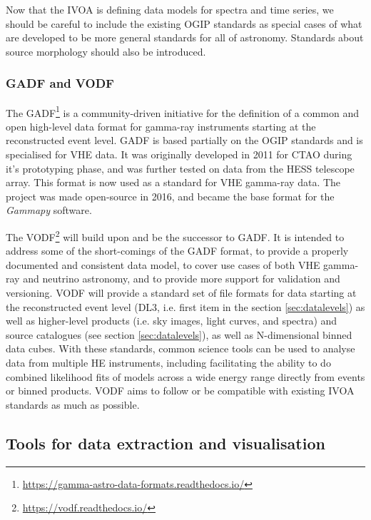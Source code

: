 \documentclass[11pt,a4paper]{ivoa}
\begin{document}
{Now that the \gls{IVOA} is defining data models for spectra and time series, we should be careful to include the existing \gls{OGIP}
standards as special cases of what are developed to be more general standards for all of astronomy. Standards about
source morphology should also be introduced.

\subsubsection{GADF and VODF}
\label{sec:GADF}

The \gls{GADF}\footnote{\url{https://gamma-astro-data-formats.readthedocs.io/}} is a community-driven initiative for the definition
of a common and open high-level data format for gamma-ray instruments \citep{2017AIPC.1792g0006D} starting at the
reconstructed event level. \gls{GADF} is based partially on the \gls{OGIP} standards and is specialised for \gls{VHE} data.
It was originally developed in 2011 for \gls{CTAO} during it's prototyping phase, and was further tested on data from the
\gls{HESS} telescope array. This format is now used as a standard for \gls{VHE} gamma-ray data. The project was made open-source
in 2016, and became the base format for the \emph{Gammapy} software.

The \gls{VODF}\footnote{\url{https://vodf.readthedocs.io/}} \citep{khelifi2023veryhighenergyopendataformat} will build upon and be the successor to \gls{GADF}. It is
intended to address some of the short-comings of the \gls{GADF} format, to provide a properly documented and consistent data
model, to cover use cases of both \gls{VHE} gamma-ray and neutrino astronomy, and to provide more support for validation and
versioning. \gls{VODF} will provide a standard set of file formats for data starting at the reconstructed event level (DL3, i.e.
first item in the section \ref{sec:datalevels}) as well as higher-level products (i.e. sky images, light curves, and spectra)
and source catalogues (see section \ref{sec:datalevels}), as well as N-dimensional binned data cubes. With these
standards, common science tools can be used to analyse data from multiple \gls{HE} instruments, including
facilitating the ability to do combined likelihood fits of models across a wide energy range directly from events or
binned products. \gls{VODF} aims to follow or be compatible with existing \gls{IVOA} standards as much as possible.

\subsection{Tools for data extraction and visualisation}
\label{sec:tools}

}
\end{document}
